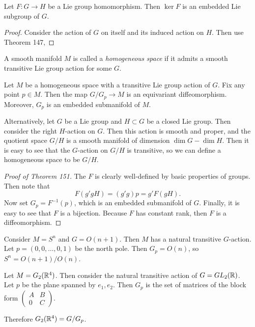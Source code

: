 \documentclass[twoside, 10pt]{article}
\begin{document}
    \begin{prop} Let $F:G \to H$ be a Lie group homomorphism. Then $\ker F$ is
    an embedded Lie subgroup of $G$.  \end{prop}

    \begin{proof} Consider the action of $G$ on itself and its induced action
    on $H$. Then use Theorem 147, \end{proof}

    \begin{defn} A smooth manifold $M$ is called a \textit{homogeneous space}
    if it admits a smooth transitive Lie group action for some $G$.  \end{defn}

    \begin{thm} Let $M$ be a homogeneous space with a transitive Lie group
    action of $G$. Fix any point $p \in M$. Then the map $G/G_p \to M$ is an
equivariant diffeomorphism. Moreover, $G_p$ is an embedded submanifold of $M$.
\end{thm}

    Alternatively, let $G$ be a Lie group and $H \subset G$ be a closed Lie
    group. Then consider the right $H$-action on $G$. Then this action is
    smooth and proper, and the quotient space $G/H$ is a smooth manifold of
    dimension $\dim G - \dim H$. Then it is easy to see that the $G$-action on
    $G/H$ is transitive, so we can define a homogeneous space to be $G/H$.

    \begin{proof}[Proof of Theorem 151] The $F$ is clearly well-defined by
        basic properties of groups. Then note that \[ F(g'gH) = (g'g)p = g'
        F(gH).\] Now set $G_p = F^{-1}(p)$, which is an embedded submanifold of
        $G$. Finally, it is easy to see that $F$ is a bijection. Because $F$
        has constant rank, then $F$ is a diffeomorphism.  \end{proof}

    \begin{exm} Consider $M = S^n$ and $G = O(n+1)$. Then $M$ has a natural
    transitive $G$-action. Let $p = (0, 0, \ldots, 0, 1)$ be the north pole.
Then $G_p = O(n)$, so $S^n = O(n+1)/O(n)$.  \end{exm}

    \begin{exm} Let $M = G_2(\mathbb{R}^4)$. Then consider the natural transitive
        action of $G = GL_2(\mathbb{R})$. Let $p$ be the plane spanned by $e_1, e_2$.
        Then $G_p$ is the set of matrices of the block form $ \begin{pmatrix} A
        & B \\ 0 & C \end{pmatrix} $.

        Therefore $G_2(\mathbb{R}^4) = G/G_p$.  \end{exm}
\end{document}
